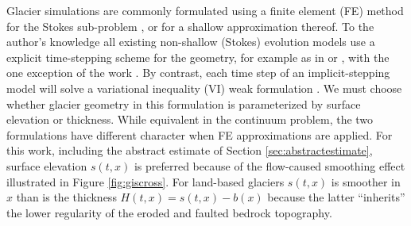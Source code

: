 \documentclass[hidelinks,onefignum,onetabnum,final]{siamart220329}  %
\begin{document}
Glacier simulations are commonly formulated using a finite element (FE) method for the Stokes sub-problem \cite{IsaacStadlerGhattas2015,Jouvetetal2008,Pattynetal2008}, or for a shallow approximation thereof.  To the author's knowledge all existing non-shallow (Stokes) evolution models use a explicit time-stepping scheme for the geometry, for example as in \cite{Jouvetetal2008} or \cite{LofgrenAhlkronaHelanow2022}, with the one exception of the work \cite{WirbelJarosch2020}.  By contrast, each time step of an implicit-stepping model will solve a variational inequality (VI) weak formulation \cite{Evans2010,KinderlehrerStampacchia1980}.  We must choose whether glacier geometry in this formulation is parameterized by surface elevation or thickness.  While equivalent in the continuum problem, the two formulations have different character when FE approximations are applied.  For this work, including the abstract estimate of Section \ref{sec:abstractestimate}, surface elevation $s(t,x)$ is preferred because of the flow-caused smoothing effect illustrated in Figure \ref{fig:giscross}.  For land-based glaciers $s(t,x)$ is smoother in $x$ than is the thickness $H(t,x) = s(t,x)-b(x)$ because the latter ``inherits'' the lower regularity of the eroded and faulted bedrock topography.
\end{document}
